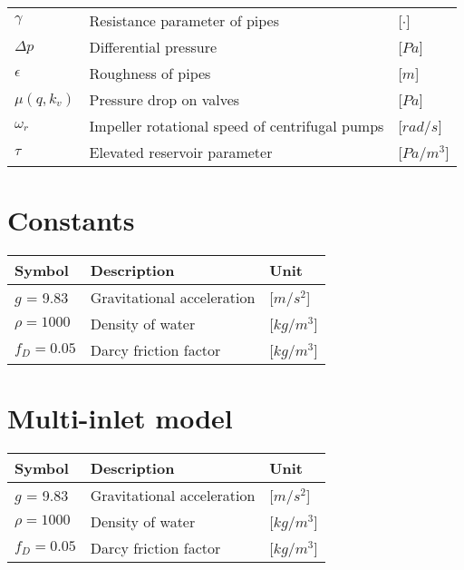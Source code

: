 \begin{tabular}{l l l}
	$\gamma$			&	Resistance parameter of pipes 						& \hspace{25mm}[$\cdot$]\\	
	$\Delta p$			&	Differential pressure 						    	& \hspace{25mm}[$Pa$]\\
	$\epsilon$			&	Roughness of pipes 						    		& \hspace{25mm}[$m$]\\	
	$\mu(q,k_v)$		&	Pressure drop on valves 						   	& \hspace{25mm}[$Pa$]\\
	$\omega_r$			&	Impeller rotational speed of centrifugal pumps 		& \hspace{25mm}[$rad/s$]\\
	$\tau$				&	Elevated reservoir parameter 			 			& \hspace{25mm}[$Pa/m^3$]\\	
\end{tabular}

\section*{Constants}

\begin{tabular}{l l l} 
	\textbf{Symbol}		&	\textbf{Description}							& \hspace{64mm}\textbf{Unit}			\\\hline						
	$g$ = 9.83 			&	Gravitational acceleration						& \hspace{64mm}[$m/s^2$]\\
	$\rho = 1000$		&	Density of water								& \hspace{64mm}[$kg/m^3$]\\
	$f_D = 0.05$		&	Darcy friction factor							& \hspace{64mm}[$kg/m^3$]\\
\end{tabular}

\section*{Multi-inlet model}

\begin{tabular}{l l l} 
	\textbf{Symbol}		&	\textbf{Description}							& \hspace{64mm}\textbf{Unit}			\\\hline						
	$g$ = 9.83 			&	Gravitational acceleration						& \hspace{64mm}[$m/s^2$]\\
	$\rho = 1000$		&	Density of water								& \hspace{64mm}[$kg/m^3$]\\
	$f_D = 0.05$		&	Darcy friction factor							& \hspace{64mm}[$kg/m^3$]\\
\end{tabular}

